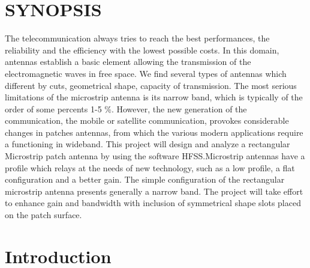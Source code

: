 \documentclass[12pt]{article}
\begin{document}
\tableofcontents
\thispagestyle{empty}
\cleardoublepage
\listoffigures
\thispagestyle{empty}
\cleardoublepage
\listoftables
\thispagestyle{empty}


\section*{SYNOPSIS}
	\justify
	The telecommunication always tries to reach the best performances, the reliability and the efficiency with the lowest possible costs. In this domain, antennas establish a basic element allowing the transmission of the electromagnetic waves in free space. We find several types of antennas which different by cuts, geometrical shape, capacity of transmission. The most serious limitations of the microstrip antenna is its narrow band, which is typically of the order of some percents 1-5 \%. However, the new generation of the communication, the mobile or satellite communication, provokes considerable changes in patches antennas, from which the various modern applications require a functioning in wideband.
	This  project will design and analyze a rectangular Microstrip patch antenna by using the software HFSS.Microstrip antennas have a profile which relays at the needs of new technology, such as a low profile, a flat configuration and a better gain. The simple configuration of the rectangular microstrip antenna presents generally a narrow band. The project will take effort to enhance gain and bandwidth with inclusion of symmetrical shape slots placed on the patch surface.
\thispagestyle{empty}
\cleardoublepage





\setcounter{page}{1}
\section{Introduction}\label{sec:Introduction}
\end{document}

